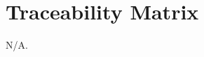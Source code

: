 \documentclass[12pt, titlepage]{article}
\newcommand{\acref}[1]{AC\ref{#1}}
\newcommand{\mref}[1]{M\ref{#1}}
\begin{document}
\section{Traceability Matrix} \label{SecTM}
N/A.
%
%
%
%
\end{document}
